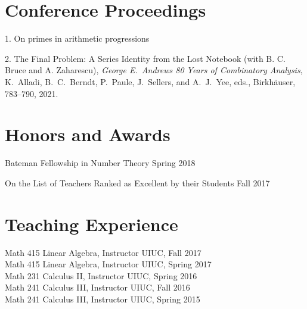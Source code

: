 \documentclass[margin,line,pifont,palatino,courier]{res}
\begin{document}
\begin{resume}
\section{\sc Conference Proceedings}
1. {On primes in arithmetic progressions}

2. {The Final Problem: A Series Identity from the Lost Notebook} (with B. C. Bruce and A. Zaharescu),  \emph{ George E.~Andrews 80 Years of Combinatory Analysis}, K.~Alladi, B.~C.~Berndt, P.~Paule, J.~Sellers, and A.~J.~Yee, eds.,  Birkh\"{a}user, 783--790, 2021.


\section{\sc Honors and Awards}


{Bateman Fellowship in Number Theory} \hfill{Spring 2018}


{On the List of Teachers Ranked as Excellent by their Students} \hfill{Fall 2017}

%
%
%
%
%
%
%


\section{\sc Teaching Experience}
Math 415 Linear Algebra, Instructor {\hfill  UIUC, Fall 2017}\\
Math 415 Linear Algebra, Instructor {\hfill  UIUC, Spring 2017}\\
Math 231 Calculus II, Instructor {\hfill  UIUC, Spring 2016}\\
Math 241 Calculus III, Instructor {\hfill  UIUC, Fall 2016} \\
Math 241 Calculus III, Instructor {\hfill  UIUC, Spring 2015}



\end{resume}
\end{document}
